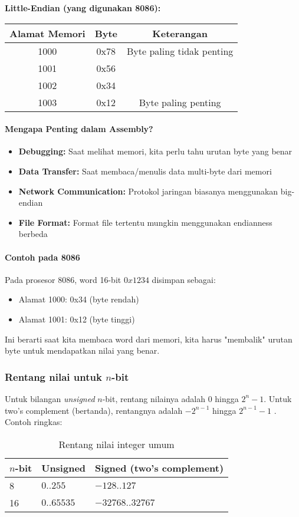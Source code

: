 \textbf{Little-Endian (yang digunakan 8086):}
\begin{center}
\begin{tabular}{|c|c|c|}
\hline
\textbf{Alamat Memori} & \textbf{Byte} & \textbf{Keterangan} \\
\hline
1000 & 0x78 & Byte paling tidak penting \\
1001 & 0x56 & \\
1002 & 0x34 & \\
1003 & 0x12 & Byte paling penting \\
\hline
\end{tabular}
\end{center}

\paragraph{Mengapa Penting dalam Assembly?}
\begin{itemize}
    \item \textbf{Debugging:} Saat melihat memori, kita perlu tahu urutan byte yang benar
    \item \textbf{Data Transfer:} Saat membaca/menulis data multi-byte dari memori
    \item \textbf{Network Communication:} Protokol jaringan biasanya menggunakan big-endian
    \item \textbf{File Format:} Format file tertentu mungkin menggunakan endianness berbeda
\end{itemize}

\paragraph{Contoh pada 8086}
Pada prosesor 8086, word 16-bit \(0x1234\) disimpan sebagai:
\begin{itemize}
    \item Alamat 1000: 0x34 (byte rendah)
    \item Alamat 1001: 0x12 (byte tinggi)
\end{itemize}

Ini berarti saat kita membaca word dari memori, kita harus "membalik" urutan byte untuk mendapatkan nilai yang benar.

\subsubsection{Rentang nilai untuk $n$-bit}
Untuk bilangan \textit{unsigned} $n$-bit, rentang nilainya adalah $0$ hingga $2^n-1$. Untuk two's complement (bertanda), rentangnya adalah $-2^{n-1}$ hingga $2^{n-1}-1$ \cite{wiki_binary_number,wiki_two_complement}. Contoh ringkas:
\begin{table}[h]
\centering
\caption{Rentang nilai integer umum}
\begin{tabular}{lll}
\toprule
\textbf{$n$-bit} & \textbf{Unsigned} & \textbf{Signed (two's complement)} \\
\midrule
8  & $0..255$       & $-128..127$ \\
16 & $0..65535$     & $-32768..32767$ \\
\bottomrule
\end{tabular}
\label{tab:range-nbit}
\end{table}

